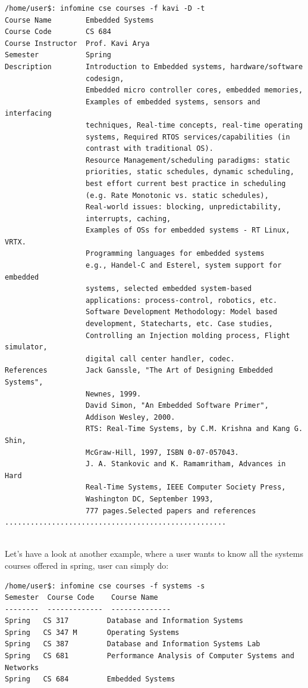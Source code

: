 \documentclass[12pt, letterpaper, twoside]{article}
\begin{document}
\begin{verbatim}
/home/user$: infomine cse courses -f kavi -D -t
Course Name        Embedded Systems
Course Code        CS 684
Course Instructor  Prof. Kavi Arya
Semester           Spring
Description        Introduction to Embedded systems, hardware/software
                   codesign, 
                   Embedded micro controller cores, embedded memories, 
                   Examples of embedded systems, sensors and interfacing 
                   techniques, Real-time concepts, real-time operating 
                   systems, Required RTOS services/capabilities (in 
                   contrast with traditional OS).
                   Resource Management/scheduling paradigms: static 
                   priorities, static schedules, dynamic scheduling, 
                   best effort current best practice in scheduling 
                   (e.g. Rate Monotonic vs. static schedules), 
                   Real-world issues: blocking, unpredictability, 
                   interrupts, caching, 
                   Examples of OSs for embedded systems - RT Linux, VRTX.
                   Programming languages for embedded systems 
                   e.g., Handel-C and Esterel, system support for embedded 
                   systems, selected embedded system-based 
                   applications: process-control, robotics, etc. 
                   Software Development Methodology: Model based 
                   development, Statecharts, etc. Case studies, 
                   Controlling an Injection molding process, Flight simulator,
                   digital call center handler, codec.
References         Jack Ganssle, "The Art of Designing Embedded Systems", 
                   Newnes, 1999.
                   David Simon, "An Embedded Software Primer", 
                   Addison Wesley, 2000.
                   RTS: Real-Time Systems, by C.M. Krishna and Kang G. Shin, 
                   McGraw-Hill, 1997, ISBN 0-07-057043.
                   J. A. Stankovic and K. Ramamritham, Advances in Hard 
                   Real-Time Systems, IEEE Computer Society Press, 
                   Washington DC, September 1993, 
                   777 pages.Selected papers and references
....................................................
 
\end{verbatim}

Let's have a look at another example, where a user wants to know all the systems courses offered in spring, user can simply do:
\begin{verbatim}
/home/user$: infomine cse courses -f systems -s
Semester  Course Code    Course Name                                           
--------  -------------  --------------  
Spring   CS 317         Database and Information Systems                       
Spring   CS 347 M       Operating Systems                                      
Spring   CS 387         Database and Information Systems Lab                   
Spring   CS 681         Performance Analysis of Computer Systems and Networks  
Spring   CS 684         Embedded Systems
\end{verbatim}
\end{document}
